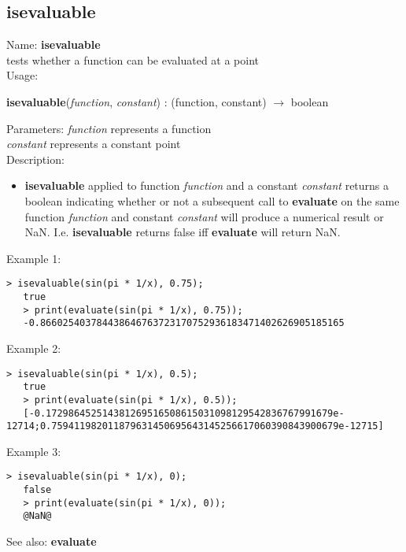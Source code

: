 \subsection{ isevaluable }
\noindent Name: \textbf{isevaluable}\\
tests whether a function can be evaluated at a point \\

\noindent Usage: 
\begin{center}
\textbf{isevaluable}(\emph{function}, \emph{constant}) : (\textsf{function}, \textsf{constant}) $\rightarrow$ \textsf{boolean}\\
\end{center}
Parameters: 
\emph{function} represents a function\\
\emph{constant} represents a constant point\\

\noindent Description: \begin{itemize}

\item \textbf{isevaluable} applied to function \emph{function} and a constant \emph{constant} returns
   a boolean indicating whether or not a subsequent call to \textbf{evaluate} on the
   same function \emph{function} and constant \emph{constant} will produce a numerical
   result or NaN. I.e. \textbf{isevaluable} returns false iff \textbf{evaluate} will return NaN.
\end{itemize}
\noindent Example 1: 
\begin{center}\begin{minipage}{14.8cm}\begin{Verbatim}[frame=single]
   > isevaluable(sin(pi * 1/x), 0.75);
   true
   > print(evaluate(sin(pi * 1/x), 0.75));
   -0.866025403784438646763723170752936183471402626905185165
\end{Verbatim}
\end{minipage}\end{center}
\noindent Example 2: 
\begin{center}\begin{minipage}{14.8cm}\begin{Verbatim}[frame=single]
   > isevaluable(sin(pi * 1/x), 0.5);
   true
   > print(evaluate(sin(pi * 1/x), 0.5));
   [-0.172986452514381269516508615031098129542836767991679e-12714;0.759411982011879631450695643145256617060390843900679e-12715]
\end{Verbatim}
\end{minipage}\end{center}
\noindent Example 3: 
\begin{center}\begin{minipage}{14.8cm}\begin{Verbatim}[frame=single]
   > isevaluable(sin(pi * 1/x), 0);
   false
   > print(evaluate(sin(pi * 1/x), 0));
   @NaN@
\end{Verbatim}
\end{minipage}\end{center}
See also: \textbf{evaluate}
